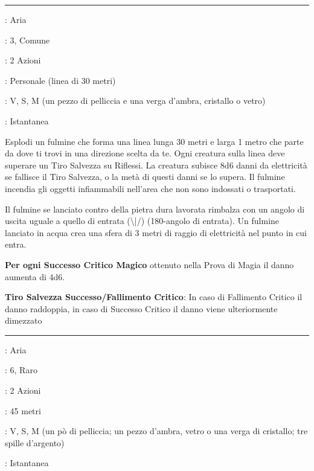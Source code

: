 \begin{multicols}{2}
\smallskip\noindent\rule{\linewidth}{2pt} \hypertarget{Fulmine}{}\smallskip{}
\noindent
\begin{description}[noitemsep, topsep=0pt, parsep=0pt, partopsep=0pt, leftmargin=0cm, labelwidth=2.8cm]
	\item[\textbf{Lista di Magia}]: Aria
	\item[\textbf{Livello}]: 3, Comune
	\item[\textbf{T. di Lancio}]: 2 Azioni
	\item[\textbf{Gittata}]: Personale (linea di 30 metri)
	\item[\textbf{Componenti}]: V, S, M (un pezzo di pelliccia e una verga d'ambra, cristallo o vetro)
	\item[\textbf{Durata}]: Istantanea
\end{description}

Esplodi un fulmine che forma una linea lunga 30 metri e larga 1 metro che parte da dove ti trovi in una direzione scelta da te. Ogni creatura sulla linea deve superare un Tiro Salvezza su Riflessi. La creatura subisce 8d6 danni da elettricità se fallisce il Tiro Salvezza, o la metà di questi danni se lo supera.
Il fulmine incendia gli oggetti infiammabili nell'area che non sono indossati o trasportati.

Il fulmine se lanciato contro della pietra dura lavorata rimbalza con un angolo di uscita uguale a quello di entrata (\textbackslash|/) (180-angolo di entrata). Un fulmine lanciato in acqua crea una sfera di 3 metri di raggio di elettricità nel punto in cui entra.

\textbf{Per ogni Successo Critico Magico} ottenuto nella Prova di Magia il danno aumenta di 4d6.

\textbf{Tiro Salvezza Successo/Fallimento Critico}: In caso di Fallimento Critico il danno raddoppia, in caso di Successo Critico il danno viene ulteriormente dimezzato

\smallskip\noindent\rule{\linewidth}{2pt} \hypertarget{Fulmine a catena}{}\smallskip{}
\noindent
\begin{description}[noitemsep, topsep=0pt, parsep=0pt, partopsep=0pt, leftmargin=0cm, labelwidth=2.8cm]
	\item[\textbf{Lista di Magia}]: Aria
	\item[\textbf{Livello}]: 6, Raro
	\item[\textbf{T. di Lancio}]: 2 Azioni
	\item[\textbf{Gittata}]: 45 metri
	\item[\textbf{Componenti}]: V, S, M (un pò di pelliccia; un pezzo d'ambra, vetro o una verga di cristallo; tre spille d'argento)
	\item[\textbf{Durata}]: Istantanea
\end{description}


\end{multicols}
